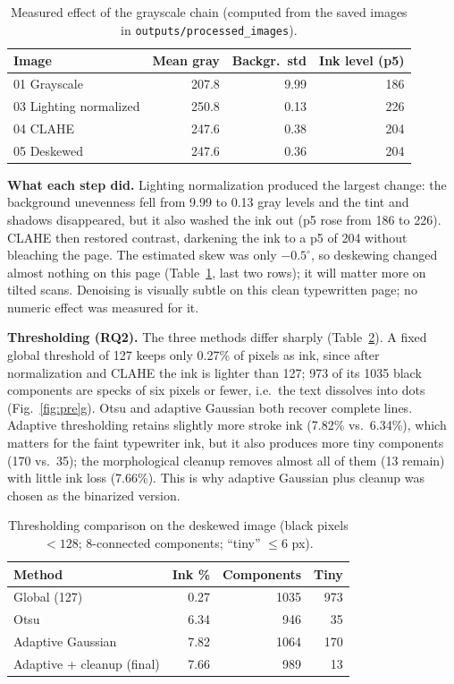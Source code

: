 \documentclass[10pt,twocolumn]{article}
\begin{document}
\begin{table}[t]
\centering\small
\caption{Measured effect of the grayscale chain (computed from the saved images in \texttt{outputs/processed\_\allowbreak{}images}).}\label{tab:prestats}
\begin{tabular}{@{}lrrr@{}}
\toprule
\textbf{Image} & \textbf{Mean gray} & \textbf{Backgr.\ std} & \textbf{Ink level (p5)}\\
\midrule
01 Grayscale & 207.8 & 9.99 & 186\\
03 Lighting normalized & 250.8 & 0.13 & 226\\
04 CLAHE & 247.6 & 0.38 & 204\\
05 Deskewed & 247.6 & 0.36 & 204\\
\bottomrule
\end{tabular}
\end{table}

\textbf{What each step did.} Lighting normalization produced the largest change: the background unevenness fell from 9.99 to 0.13 gray levels and the tint and shadows disappeared, but it also washed the ink out (p5 rose from 186 to 226). CLAHE then restored contrast, darkening the ink to a p5 of 204 without bleaching the page. The estimated skew was only $-0.5^\circ$, so deskewing changed almost nothing on this page (Table~\ref{tab:prestats}, last two rows); it will matter more on tilted scans. Denoising is visually subtle on this clean typewritten page; no numeric effect was measured for it.

\textbf{Thresholding (RQ2).} The three methods differ sharply (Table~\ref{tab:thresh}). A fixed global threshold of 127 keeps only 0.27\% of pixels as ink, since after normalization and CLAHE the ink is lighter than 127; 973 of its 1035 black components are specks of six pixels or fewer, i.e.\ the text dissolves into dots (Fig.~\ref{fig:pre}g). Otsu and adaptive Gaussian both recover complete lines. Adaptive thresholding retains slightly more stroke ink (7.82\% vs.\ 6.34\%), which matters for the faint typewriter ink, but it also produces more tiny components (170 vs.\ 35); the morphological cleanup removes almost all of them (13 remain) with little ink loss (7.66\%). This is why adaptive Gaussian plus cleanup was chosen as the binarized version.

\begin{table}[t]
\centering\small
\caption{Thresholding comparison on the deskewed image (black pixels $<128$; 8-connected components; ``tiny'' $\leq6$ px).}\label{tab:thresh}
\begin{tabular}{@{}lrrr@{}}
\toprule
\textbf{Method} & \textbf{Ink \%} & \textbf{Components} & \textbf{Tiny}\\
\midrule
Global (127) & 0.27 & 1035 & 973\\
Otsu & 6.34 & 946 & 35\\
Adaptive Gaussian & 7.82 & 1064 & 170\\
Adaptive + cleanup (final) & 7.66 & 989 & 13\\
\bottomrule
\end{tabular}
\end{table}
\end{document}
